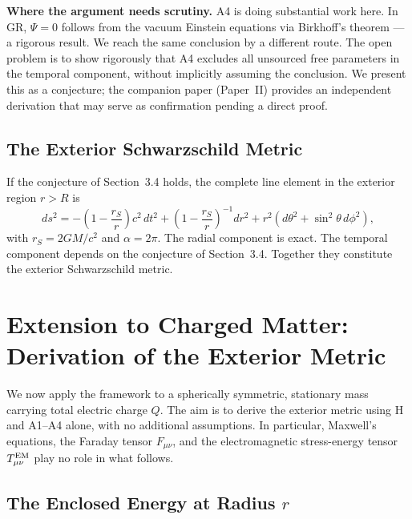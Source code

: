 \documentclass[12pt]{article}
\begin{document}
\medskip
\noindent\textbf{Where the argument needs scrutiny.}
A4 is doing substantial work here.
In GR, $\Psi = 0$ follows from the vacuum Einstein equations via
Birkhoff's theorem --- a rigorous result.
We reach the same conclusion by a different route.
The open problem is to show rigorously that A4 excludes all unsourced
free parameters in the temporal component, without implicitly assuming
the conclusion.
We present this as a conjecture; the companion paper (Paper~II) provides
an independent derivation that may serve as confirmation pending a
direct proof.

\subsection{The Exterior Schwarzschild Metric}
\label{sec:schwarzschild-metric}

If the conjecture of Section~3.4 holds, the complete line element in
the exterior region $r > R$ is
\begin{equation}
  ds^2 = -\!\left(1 - \frac{r_S}{r}\right)c^2\,dt^2
         + \left(1 - \frac{r_S}{r}\right)^{-1}dr^2
         + r^2\!\left(d\theta^2 + \sin^2\!\theta\,d\phi^2\right),
  \label{eq:schwarzschild}
\end{equation}
with $r_S = 2GM/c^2$ and $\alpha = 2\pi$.
The radial component is exact.
The temporal component depends on the conjecture of Section~3.4.
Together they constitute the exterior Schwarzschild metric.

\section{Extension to Charged Matter:
Derivation of the Exterior Metric}
\label{sec:charged}

We now apply the framework to a spherically symmetric, stationary mass
carrying total electric charge $Q$.
The aim is to derive the exterior metric using H and A1--A4 alone,
with no additional assumptions.
In particular, Maxwell's equations, the Faraday tensor $F_{\mu\nu}$,
and the electromagnetic stress-energy tensor $T_{\mu\nu}^{\rm EM}$ play
no role in what follows.

\subsection{The Enclosed Energy at Radius $r$}
\label{sec:rn-setup}
\end{document}
